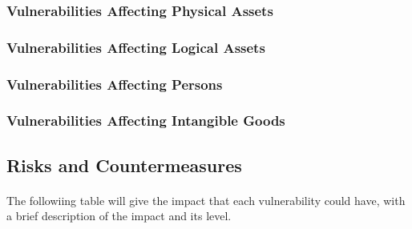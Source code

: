 \documentclass[a4paper,10pt]{article}
\begin{document}
\subsubsection{Vulnerabilities Affecting Physical Assets}
\subsubsection{Vulnerabilities Affecting Logical Assets}
\subsubsection{Vulnerabilities Affecting Persons}
\subsubsection{Vulnerabilities Affecting Intangible Goods}

\subsection{Risks and Countermeasures}

\paragraph{} The followiing table will give the impact that each vulnerability could have, with a brief description of the impact and its level.
\end{document}
